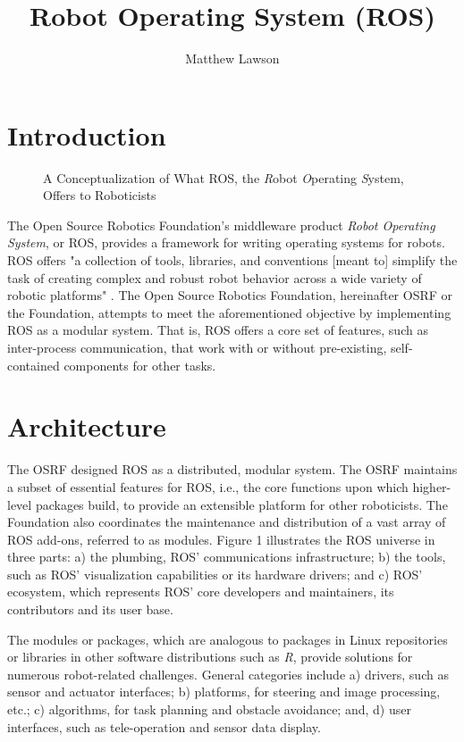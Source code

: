 \documentclass[9pt,twocolumn,twoside]{../../styles/osajnl}
\title{Robot Operating System (ROS)}
\author[1]{Matthew Lawson}
\affil[1]{School of Informatics and Computing, Bloomington, IN 47408, U.S.A.}
\affil[*]{Corresponding authors: laszewski@gmail.com}
\begin{document}
\maketitle

\section{Introduction}

\begin{figure*}[htbp]
\centering
{}
\caption{A Conceptualization of What ROS, the \textit{R}obot \textit{O}perating \textit{S}ystem, Offers to Roboticists \cite{www-ros-ros-is}}
\label{fig:rosOverview}
\end{figure*}

The Open Source Robotics Foundation's middleware product \textit{Robot Operating System}, or ROS, provides a framework for writing operating systems for robots.  ROS offers "a collection of tools, libraries, and conventions [meant to] simplify the task of creating complex and robust robot behavior across a wide variety of robotic platforms" \cite{www-ros-about}. The Open Source Robotics Foundation, hereinafter OSRF or the Foundation, attempts to meet the aforementioned objective by implementing ROS as a modular system.  That is, ROS offers a core set of features, such as inter-process communication, that work with or without pre-existing, self-contained components for other tasks.

\section{Architecture} 

The OSRF designed ROS as a distributed, modular system.  The OSRF maintains a subset of essential features for ROS, i.e., the core functions upon which higher-level packages build, to provide an extensible platform for other roboticists.  The Foundation also coordinates the maintenance and distribution of a vast array of ROS add-ons, referred to as modules.  Figure 1 illustrates the ROS universe in three parts: a) the plumbing, ROS' communications infrastructure; b) the tools, such as ROS' visualization capabilities or its hardware drivers; and c) ROS' ecosystem, which represents ROS' core developers and maintainers, its contributors and its user base.

The modules or packages, which are analogous to packages in Linux repositories or libraries in other software distributions such as \textit{R}, provide solutions for numerous robot-related challenges.  General categories include a) drivers, such as sensor and actuator interfaces; b) platforms, for steering and image processing, etc.; c) algorithms, for task planning and obstacle avoidance; and, d) user interfaces, such as tele-operation and sensor data display. \cite{www-software-categories}
\end{document}
